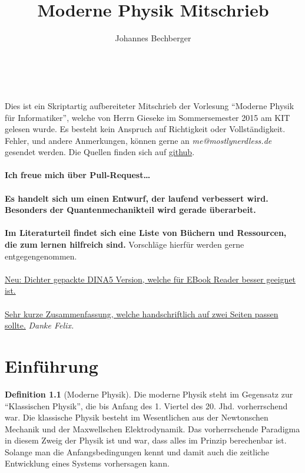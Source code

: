 \documentclass[oneside]{book}
\theoremstyle{definition}
\newtheorem*{definition*}{Definition}
\begin{document}
\title{Moderne Physik Mitschrieb}

\author{Johannes Bechberger}

\maketitle

\tableofcontents
~\\~\\
	Dies ist ein Skriptartig aufbereiteter Mitschrieb der Vorlesung "`Moderne Physik für Informatiker"', welche von Herrn Gieseke im Sommersemester 2015 am KIT gelesen wurde. Es besteht kein Anspruch auf Richtigkeit oder Vollständigkeit. Fehler, und andere Anmerkungen, können gerne an \textit{me@mostlynerdless.de} gesendet werden. Die Quellen finden sich auf \href{https://github.com/parttimenerd/Moderne-Physik}{github}.\\
	~\\
	\textbf{Ich freue mich über Pull-Request\dots}\\
	~\\
	\textbf{Es handelt sich um einen Entwurf, der laufend verbessert wird. Besonders der Quantenmechanikteil wird gerade überarbeit.} ~\\
	
	~\\
	\textbf{Im Literaturteil findet sich eine Liste von Büchern und Ressourcen, die zum lernen hilfreich sind.} Vorschläge hierfür werden gerne entgegengenommen.
	~\\
	~\\
	\href{http://lgö.de/studium/moderne_physik/skript_dina5.pdf}{Neu: Dichter gepackte DINA5 Version, welche für EBook Reader besser geeignet ist.}
	~\\
	~\\
	\href{http://lgö.de/studium/moderne_physik/summary.pdf}{Sehr kurze Zusammenfassung, welche handschriftlich auf zwei Seiten passen sollte.} \textit{Danke Felix.}
\listoftodos

\chapter{Einführung}

\begin{definition*}[Moderne Physik]
	Die moderne Physik steht im Gegensatz zur "`Klassischen Physik"', die bis Anfang des 1. Viertel des 20. Jhd. vorherrschend war. Die klassische Physik besteht im Wesentlichen aus der Newtonschen Mechanik und der Maxwellschen Elektrodynamik.
	Das vorherrschende Paradigma in diesem Zweig der Physik ist und war, dass alles im Prinzip berechenbar ist. Solange man die Anfangsbedingungen kennt und damit auch die zeitliche Entwicklung eines Systems vorhersagen kann.
\end{definition*}
\end{document}
